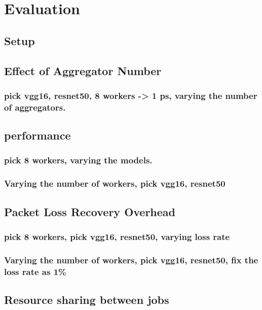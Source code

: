 \section{Evaluation}
\subsection{Setup}


\subsection{Effect of Aggregator Number}
\subsubsection{pick vgg16, resnet50, 8 workers -> 1 ps, varying the number of aggregators.}


\subsection{\system performance}
\subsubsection{pick 8 workers, varying the models.}
\subsubsection{Varying the number of workers, pick vgg16, resnet50 }


\subsection{Packet Loss Recovery Overhead}
\subsubsection{pick 8 workers, pick vgg16, resnet50, varying loss rate  }
\subsubsection{Varying the number of workers, pick vgg16, resnet50, fix the loss rate as 1\% }

\subsection{Resource sharing between jobs}

